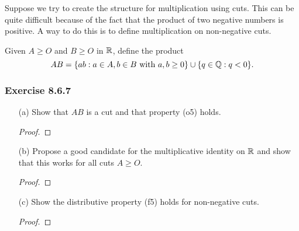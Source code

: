 Suppose we try to create the structure for multiplication using cuts. This can be quite difficult because of the fact that the product of two negative numbers is positive. A way to do this is to define multiplication on non-negative cuts.

Given \( A \geq O  \) and \( B \geq O  \) in \( \mathbb{R}  \), define the product 
\[  AB = \{ ab: a \in A , b \in B \ \text{with} \ a,b \geq 0  \} \cup \{ q \in \mathbb{Q} : q < 0  \}. \]

\subsubsection{Exercise 8.6.7} 
\begin{enumerate}
    \item[(a)] Show that \( AB  \) is a cut and that property (o5) holds.
        \begin{proof}
        
        \end{proof}
    \item[(b)] Propose a good candidate for the multiplicative identity on \( \mathbb{R}  \) and show that this works for all cuts \( A \geq O  \).
        \begin{proof}
        
        \end{proof}
    \item[(c)] Show the distributive property (f5) holds for non-negative cuts.
        \begin{proof}
        
        \end{proof}
\end{enumerate}


